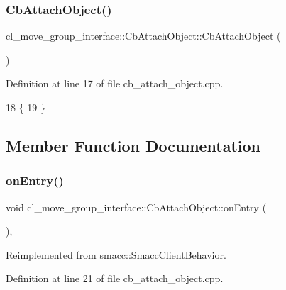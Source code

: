\subsubsection{\texorpdfstring{Cb\+Attach\+Object()}{CbAttachObject()}\hspace{0.1cm}{\footnotesize\ttfamily [2/2]}}
{\footnotesize\ttfamily cl\+\_\+move\+\_\+group\+\_\+interface\+::\+Cb\+Attach\+Object\+::\+Cb\+Attach\+Object (\begin{DoxyParamCaption}{ }\end{DoxyParamCaption})}



Definition at line 17 of file cb\+\_\+attach\+\_\+object.\+cpp.


\begin{DoxyCode}
18     \{
19         \}
\end{DoxyCode}


\subsection{Member Function Documentation}
\mbox{\label{classcl__move__group__interface_1_1CbAttachObject_a05cd996ea25ee1b2ae74541a5ec56e98}} 
\subsubsection{\texorpdfstring{on\+Entry()}{onEntry()}}
{\footnotesize\ttfamily void cl\+\_\+move\+\_\+group\+\_\+interface\+::\+Cb\+Attach\+Object\+::on\+Entry (\begin{DoxyParamCaption}{ }\end{DoxyParamCaption})\hspace{0.3cm}{\ttfamily [override]}, {\ttfamily [virtual]}}



Reimplemented from \hyperlink{classsmacc_1_1SmaccClientBehavior_ad5d3e1f1697c3cfe66c94cadba948493}{smacc\+::\+Smacc\+Client\+Behavior}.



Definition at line 21 of file cb\+\_\+attach\+\_\+object.\+cpp.



